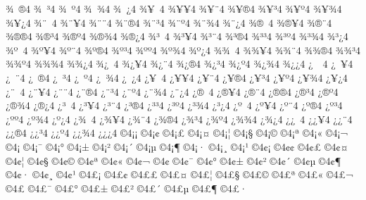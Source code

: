 {^^be^^a0^^ae4
^^be^^a0^^b34
^^be^^a0^^ba4
^^be^^a0^^be4
^^be^^a0^^bf4
^^be^^a5^^a04
^^be^^a5^^a54
^^be^^a5^^a84
^^be^^a5^^ae4
^^be^^a5^^b34
^^be^^a5^^ba4
^^be^^a5^^be4
^^be^^a5^^bf4
^^be^^a8^^a04
^^be^^a8^^a54
^^be^^a8^^a84
^^be^^a8^^ae4
^^be^^a8^^b34
^^be^^a8^^ba4
^^be^^a8^^be4
^^be^^a8^^bf4
^^be^^ae^^a04
^^be^^ae^^a54
^^be^^ae^^a84
^^be^^ae^^ae4
^^be^^ae^^b34
^^be^^ae^^ba4
^^be^^ae^^be4
^^be^^ae^^bf4
^^be^^b3^^a04
^^be^^b3^^a54
^^be^^b3^^a84
^^be^^b3^^ae4
^^be^^b3^^b34
^^be^^b3^^ba4
^^be^^b3^^be4
^^be^^b3^^bf4
^^be^^ba^^a04
^^be^^ba^^a54
^^be^^ba^^a84
^^be^^ba^^ae4
^^be^^ba^^b34
^^be^^ba^^ba4
^^be^^ba^^be4
^^be^^ba^^bf4
^^be^^be^^a04
^^be^^be^^a54
^^be^^be^^a84
^^be^^be^^ae4
^^be^^be^^b34
^^be^^be^^ba4
^^be^^be^^be4
^^be^^be^^bf4
^^be^^bf^^a04
^^be^^bf^^a54
^^be^^bf^^a84
^^be^^bf^^ae4
^^be^^bf^^b34
^^be^^bf^^ba4
^^be^^bf^^be4
^^be^^bf^^bf4
^^bf^^a0^^a04
^^bf^^a0^^a54
^^bf^^a0^^a84
^^bf^^a0^^ae4
^^bf^^a0^^b34
^^bf^^a0^^ba4
^^bf^^a0^^be4
^^bf^^a0^^bf4
^^bf^^a5^^a04
^^bf^^a5^^a54
^^bf^^a5^^a84
^^bf^^a5^^ae4
^^bf^^a5^^b34
^^bf^^a5^^ba4
^^bf^^a5^^be4
^^bf^^a5^^bf4
^^bf^^a8^^a04
^^bf^^a8^^a54
^^bf^^a8^^a84
^^bf^^a8^^ae4
^^bf^^a8^^b34
^^bf^^a8^^ba4
^^bf^^a8^^be4
^^bf^^a8^^bf4
^^bf^^ae^^a04
^^bf^^ae^^a54
^^bf^^ae^^a84
^^bf^^ae^^ae4
^^bf^^ae^^b34
^^bf^^ae^^ba4
^^bf^^ae^^be4
^^bf^^ae^^bf4
^^bf^^b3^^a04
^^bf^^b3^^a54
^^bf^^b3^^a84
^^bf^^b3^^ae4
^^bf^^b3^^b34
^^bf^^b3^^ba4
^^bf^^b3^^be4
^^bf^^b3^^bf4
^^bf^^ba^^a04
^^bf^^ba^^a54
^^bf^^ba^^a84
^^bf^^ba^^ae4
^^bf^^ba^^b34
^^bf^^ba^^ba4
^^bf^^ba^^be4
^^bf^^ba^^bf4
^^bf^^be^^a04
^^bf^^be^^a54
^^bf^^be^^a84
^^bf^^be^^ae4
^^bf^^be^^b34
^^bf^^be^^ba4
^^bf^^be^^be4
^^bf^^be^^bf4
^^bf^^bf^^a04
^^bf^^bf^^a54
^^bf^^bf^^a84
^^bf^^bf^^ae4
^^bf^^bf^^b34
^^bf^^bf^^ba4
^^bf^^bf^^be4
^^bf^^bf^^bf4
^^a94^^a1^^a1
^^a94^^a1^^a2
^^a94^^a1^^a3
^^a94^^a1^^a4
^^a94^^a1^^a6
^^a94^^a1^^a7
^^a94^^a1^^a9
^^a94^^a1^^aa
^^a94^^a1^^ab
^^a94^^a1^^ac
^^a94^^a1^^ad
^^a94^^a1^^af
^^a94^^a1^^b0
^^a94^^a1^^b1
^^a94^^a1^^b2
^^a94^^a1^^b4
^^a94^^a1^^b5
^^a94^^a1^^b6
^^a94^^a1^^b7
^^a94^^a1^^b8
^^a94^^a1^^b9
^^a94^^a2^^a1
^^a94^^a2^^a2
^^a94^^a2^^a3
^^a94^^a2^^a4
^^a94^^a2^^a6
^^a94^^a2^^a7
^^a94^^a2^^a9
^^a94^^a2^^aa
^^a94^^a2^^ab
^^a94^^a2^^ac
^^a94^^a2^^ad
^^a94^^a2^^af
^^a94^^a2^^b0
^^a94^^a2^^b1
^^a94^^a2^^b2
^^a94^^a2^^b4
^^a94^^a2^^b5
^^a94^^a2^^b6
^^a94^^a2^^b7
^^a94^^a2^^b8
^^a94^^a2^^b9
^^a94^^a3^^a1
^^a94^^a3^^a2
^^a94^^a3^^a3
^^a94^^a3^^a4
^^a94^^a3^^a6
^^a94^^a3^^a7
^^a94^^a3^^a9
^^a94^^a3^^aa
^^a94^^a3^^ab
^^a94^^a3^^ac
^^a94^^a3^^ad
^^a94^^a3^^af
^^a94^^a3^^b0
^^a94^^a3^^b1
^^a94^^a3^^b2
^^a94^^a3^^b4
^^a94^^a3^^b5
^^a94^^a3^^b6
^^a94^^a3^^b7
}
